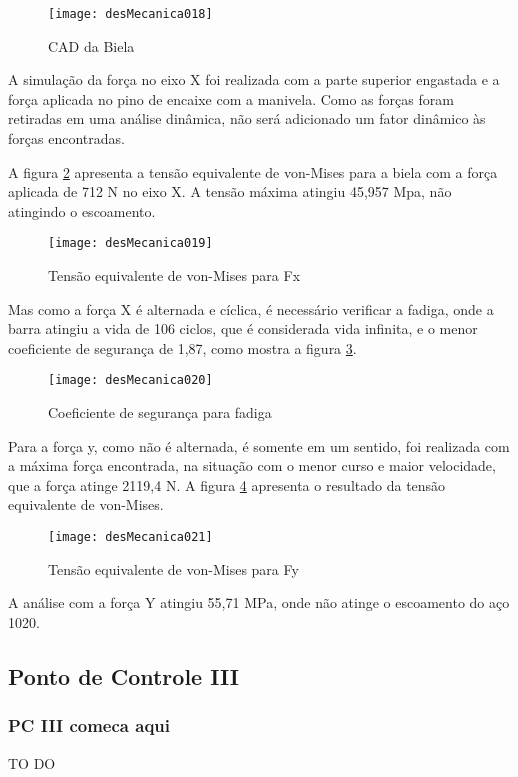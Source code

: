 		\newpage
		\begin{figure}[!h]
			\centering
			\texttt{[image: desMecanica018]}
			\caption{CAD da Biela}
			\label{desMecanica018}
		\end{figure}

		A simulação da força no eixo X foi realizada com a parte superior engastada e a força aplicada no pino de encaixe com a manivela. Como as forças foram retiradas em uma análise dinâmica, não será adicionado um fator dinâmico às forças encontradas.
		
		A figura \ref{desMecanica019} apresenta a tensão equivalente de von-Mises para a biela com a força aplicada de 712 N no eixo X. A tensão máxima atingiu 45,957 Mpa, não atingindo o escoamento.

		\newpage
		\begin{figure}[!h]
			\centering
			\texttt{[image: desMecanica019]}
			\caption{Tensão equivalente de von-Mises para Fx}
			\label{desMecanica019}
		\end{figure}

		Mas como a força X é alternada e cíclica, é necessário verificar a fadiga, onde a barra atingiu a vida de 106 ciclos, que é considerada vida infinita, e o menor coeficiente de segurança de 1,87, como mostra a figura \ref{desMecanica020}. 

		\newpage
		\begin{figure}[!h]
			\centering
			\texttt{[image: desMecanica020]}
			\caption{Coeficiente de segurança para fadiga}
			\label{desMecanica020}
		\end{figure}

		Para a força y, como não é alternada, é somente em um sentido, foi realizada com a máxima força encontrada, na situação com o menor curso e maior velocidade, que a força atinge 2119,4 N. A figura \ref{desMecanica021} apresenta o resultado da tensão equivalente de von-Mises.

		\newpage
		\begin{figure}[!h]
			\centering
			\texttt{[image: desMecanica021]}
			\caption{Tensão equivalente de von-Mises para Fy}
			\label{desMecanica021}
		\end{figure}

		A análise com a força Y atingiu 55,71 MPa, onde não atinge o escoamento do aço 1020.


\newpage
\subsection{Ponto de Controle III}
\subsubsection{PC III comeca aqui}
	
	TO DO






